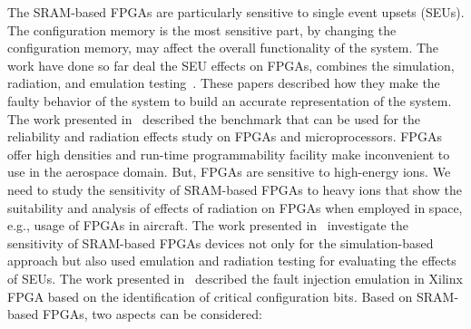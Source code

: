 The SRAM-based FPGAs are particularly sensitive to single event upsets (SEUs). The configuration memory is the most sensitive part, by changing the configuration memory, may affect the overall functionality of the system. The work have done so far deal the SEU effects on FPGAs, combines the simulation, radiation, and emulation testing~\cite{quinn2015validation, violante2004simulation, hobeika2014multi, robache2013methodology, quinn2015using, souari2015optimization}. These papers described how they make the faulty behavior of the system to build an accurate representation of the system. The work presented in~\cite{quinn2015using} described the benchmark that can be used for the reliability and radiation effects study on FPGAs and microprocessors. FPGAs offer high densities and run-time programmability facility make inconvenient to use in the aerospace domain. But, FPGAs are sensitive to high-energy ions.  We need to study the sensitivity of SRAM-based FPGAs to heavy ions that show the suitability and analysis of effects of radiation on FPGAs when employed in space, e.g., usage of FPGAs in aircraft. The work presented in~\cite{hobeika2014multi} investigate the sensitivity of SRAM-based FPGAs devices not only for the simulation-based approach but also used emulation and radiation testing for evaluating the effects of SEUs. The work presented in~\cite{souari2015optimization} described the fault injection emulation in Xilinx FPGA based on the identification of critical configuration bits. Based on SRAM-based FPGAs, two aspects can be considered:

%
%
%
%



